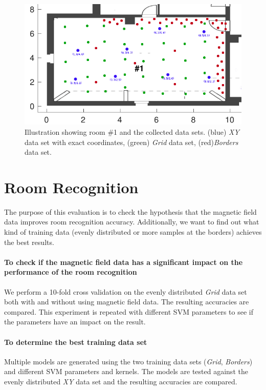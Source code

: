 \begin{figure}[bh]
\centering
\includegraphics[width=\textwidth]{Figures/DataSets.png}
\decoRule
\caption[Collected Data Sets]{Illustration showing room \#1 and the collected data sets. (blue) \emph{XY} data set with exact coordinates, (green) \emph{Grid} data set, (red)\emph{Borders} data set.}
\label{fig:DataSets}
\end{figure}

\section{Room Recognition}
\label{EvaluationRoomRecognition}

The purpose of this evaluation is to check the hypothesis that the magnetic field data improves room recognition accuracy. Additionally, we want to find out what kind of training data (evenly distributed or more samples at the borders) achieves the best results.

\paragraph{To check if the magnetic field data has a significant impact on the performance of the room recognition} We perform a 10-fold cross validation\cite{crossvalidation} on the evenly distributed \emph{Grid} data set both with and without using magnetic field data. The resulting accuracies are compared. This experiment is repeated with different SVM parameters to see if the parameters have an impact on the result.

\paragraph{To determine the best training data set} Multiple models are generated using the two training data sets (\emph{Grid}, \emph{Borders}) and different SVM parameters and kernels. The models are tested against the evenly distributed \emph{XY} data set and the resulting accuracies are compared.

